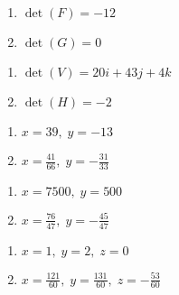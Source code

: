 \begin{multicols}{2}
\begin{enumerate}
\setcounter{enumi}{\value{HW}}

\item $\det(F) = -12$
\item $\det(G) = 0$

\setcounter{HW}{\value{enumi}}
\end{enumerate}
\end{multicols}

\begin{multicols}{2}
\begin{enumerate}
\setcounter{enumi}{\value{HW}}

\item $\det(V) = 20i + 43j + 4k$
\item $\det(H) = -2$

\setcounter{HW}{\value{enumi}}
\end{enumerate}
\end{multicols}

\begin{multicols}{2}
\begin{enumerate}
\setcounter{enumi}{\value{HW}}

\item $x = 39, \; y = -13$
\item $x = \frac{41}{66}, \; y=-\frac{31}{33}$

\setcounter{HW}{\value{enumi}}
\end{enumerate}
\end{multicols}

\begin{multicols}{2}
\begin{enumerate}
\setcounter{enumi}{\value{HW}}

\item  $x=7500, \; y=500$
\item  $x = \frac{76}{47}, \; y=-\frac{45}{47}$


\setcounter{HW}{\value{enumi}}
\end{enumerate}
\end{multicols}

\begin{multicols}{2}
\begin{enumerate}
\setcounter{enumi}{\value{HW}}

\item $x = 1, \; y = 2, \; z = 0$
\item $x = \frac{121}{60}, \; y = \frac{131}{60}, \; z = -\frac{53}{60}$


\setcounter{HW}{\value{enumi}}
\end{enumerate}
\end{multicols}

